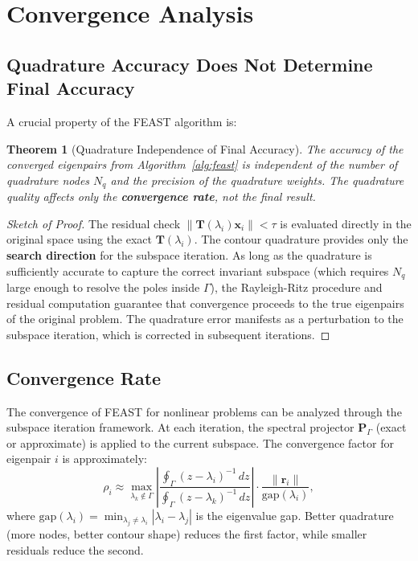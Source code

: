 \documentclass[12pt,a4paper]{article}
\newtheorem{theorem}{Theorem}[section]
\theoremstyle{definition}
\begin{document}
\section{Convergence Analysis}

\subsection{Quadrature Accuracy Does Not Determine Final Accuracy}

A crucial property of the FEAST algorithm is:

\begin{theorem}[Quadrature Independence of Final Accuracy]\label{thm:quad_independent}
The accuracy of the converged eigenpairs from Algorithm~\ref{alg:feast} is independent of the number of quadrature nodes $N_q$ and the precision of the quadrature weights. The quadrature quality affects only the \textbf{convergence rate}, not the final result.
\end{theorem}

\begin{proof}[Sketch of Proof]
The residual check $\|\mathbf{T}(\lambda_i)\mathbf{x}_i\| < \tau$ is evaluated directly in the original space using the exact $\mathbf{T}(\lambda_i)$. The contour quadrature provides only the \textbf{search direction} for the subspace iteration. As long as the quadrature is sufficiently accurate to capture the correct invariant subspace (which requires $N_q$ large enough to resolve the poles inside $\Gamma$), the Rayleigh-Ritz procedure and residual computation guarantee that convergence proceeds to the true eigenpairs of the original problem. The quadrature error manifests as a perturbation to the subspace iteration, which is corrected in subsequent iterations.
\end{proof}

\subsection{Convergence Rate}

The convergence of FEAST for nonlinear problems can be analyzed through the subspace iteration framework. At each iteration, the spectral projector $\mathbf{P}_{\Gamma}$ (exact or approximate) is applied to the current subspace. The convergence factor for eigenpair $i$ is approximately:
\begin{equation}\label{eq:convergence_factor}
\rho_i \approx \max_{\lambda_k \notin \Gamma} \left|\frac{\oint_{\Gamma} (z - \lambda_i)^{-1}\,dz}{\oint_{\Gamma} (z - \lambda_k)^{-1}\,dz}\right| \cdot \frac{\|\mathbf{r}_i\|}{\text{gap}(\lambda_i)},
\end{equation}
where $\text{gap}(\lambda_i) = \min_{\lambda_j \neq \lambda_i} |\lambda_i - \lambda_j|$ is the eigenvalue gap. Better quadrature (more nodes, better contour shape) reduces the first factor, while smaller residuals reduce the second.
\end{document}
